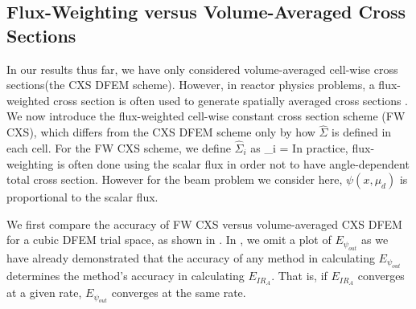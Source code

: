 \pagebreak

%
\subsection{Flux-Weighting versus Volume-Averaged Cross Sections}

In our results thus far, we have only considered volume-averaged cell-wise cross sections(the CXS DFEM scheme).
However, in reactor physics problems, a flux-weighted cross section is often used to generate spatially averaged cross sections \cite{bell_glasstone}.
We now introduce the flux-weighted cell-wise constant cross section scheme (FW CXS), which differs from the CXS DFEM scheme only by how $\hat{\Sigma}$ is defined in each cell.  
For the FW CXS scheme, we define $\hat{\Sigma}_i$ as
\benum
\hat{\Sigma}_i =  \pep
\label{eq:chap3_fw_cxs}
\eenum
In practice, flux-weighting is often done using the scalar flux in order not to have angle-dependent total cross section.  
However for the beam problem we consider here, $\psi(x,\mu_d)$ is proportional to the scalar flux.

We first compare the accuracy of FW CXS versus  volume-averaged CXS DFEM for a cubic DFEM trial space, as shown in .  
In , we omit a plot of $E_{\psi_{out}}$ as we have already demonstrated that the accuracy of any method in calculating $E_{\psi_{out}}$ determines the method's accuracy in calculating $E_{IR_A}$.  
That is, if $E_{IR_A}$ converges at a given rate, $E_{\psi_{out}}$ converges at the same rate.  

